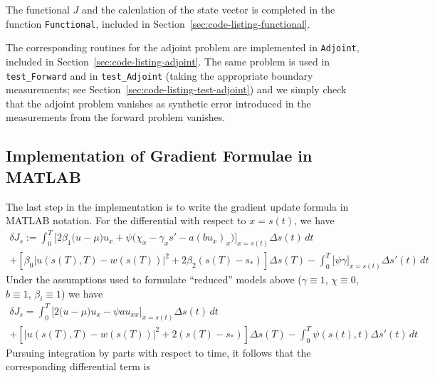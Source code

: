 \documentclass[letterpaper, 10pt, draft]{amsart}
\theoremstyle{definition}
\theoremstyle{remark}
\newcommand{\lnorm}[1]{\left\vert #1\right\vert}%
\begin{document}
The functional $J$ and the calculation of the state vector is completed in the
function \verb+Functional+, included in Section~\ref{sec:code-listing-functional}.

The corresponding routines for the adjoint problem are implemented in \verb+Adjoint+, included in Section~\ref{sec:code-listing-adjoint}.
The same problem is used in \verb+test_Forward+ and in \verb+test_Adjoint+
(taking the appropriate boundary measurements; see
Section~\ref{sec:code-listing-test-adjoint}) and we simply check that the
adjoint problem vanishes as synthetic error introduced in the measurements from
the forward problem vanishes.

\subsection{Implementation of Gradient Formulae in MATLAB}
The last step in the implementation is to write the gradient update formula in MATLAB notation.
For the differential with respect to $x=s(t)$, we have
\begin{gather*}
  {\delta J}_{s}
  := \int_0^T \Big[2\beta_1\big(u - \mu\big)u_x + \psi \big(\chi_x - \gamma_x s'  - a (b u_x)_x \big)\Big]_{x=s(t)} {\Delta s}(t)\,dt \nonumber
  \\
  +
  \left[\beta_0\lnorm{u(s(T),T) - w(s(T))}^2 + 2 \beta_2 (s(T) - s_*)\right] {\Delta s}(T) 
  - \int_0^T \big[\psi \gamma\big]_{x=s(t)} {\Delta s}'(t) \,dt
\end{gather*}
Under the assumptions used to formulate ``reduced'' models above ($\gamma \equiv
1$, $\chi \equiv 0$, $b\equiv 1$, $\beta_i \equiv 1$) we have
\begin{gather*}
  {\delta J}_{s}
  = \int_0^T \Big[2\big(u - \mu\big)u_x - \psi  a u_{xx} \Big]_{x=s(t)} {\Delta s}(t)\,dt \nonumber
  \\
  +
  \left[\lnorm{u(s(T),T) - w(s(T))}^2 + 2 (s(T) - s_*)\right] {\Delta s}(T) 
  - \int_0^T \psi(s(t),t) {\Delta s}'(t) \,dt
\end{gather*}
Pursuing integration by parts with respect to time, it follows that the corresponding differential term is
\end{document}
